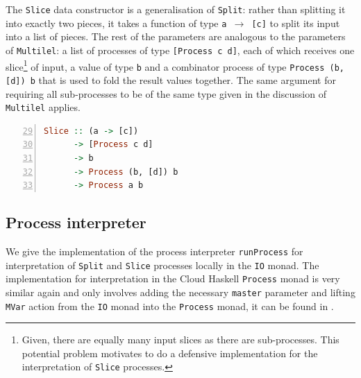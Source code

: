 The \texttt{Slice} data constructor is a generalisation of \texttt{Split}: rather than splitting it into exactly two pieces, it takes a function of type \texttt{a $\to$ [c]} to split its input into a list of pieces. The rest of the parameters are analogous to the parameters of \texttt{Multilel}: a list of processes of type \texttt{[Process c d]}, each of which receives one slice\footnote{Given, there are equally many input slices as there are sub-processes. This potential problem motivates to do a defensive implementation for the interpretation of \texttt{Slice} processes.} of input, a value of type \texttt{b} and a combinator process of type \texttt{Process (b, [d]) b} that is used to fold the result values together. The same argument for requiring all sub-processes to be of the same type given in the discussion of \texttt{Multilel} applies.
\begin{lstlisting}[language=Haskell,caption=Signature of the \texttt{Slice} data constructor.,numbers=left,frame=bt,firstnumber=29]
Slice :: (a -> [c])
      -> [Process c d]
      -> b
      -> Process (b, [d]) b
      -> Process a b
\end{lstlisting}

\subsection{Process interpreter}
We give the implementation of the process interpreter \texttt{runProcess} for interpretation of \texttt{Split} and \texttt{Slice} processes locally in the \texttt{IO} monad. The implementation for interpretation in the \textsf{Cloud Haskell} \texttt{Process} monad is very similar again and only involves adding the necessary \texttt{master} parameter and lifting \texttt{MVar} action from the \texttt{IO} monad into the \texttt{Process} monad, it can be found in .

